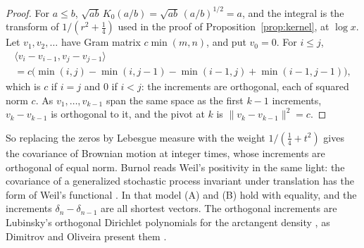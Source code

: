 \documentclass[11pt]{article}
\theoremstyle{definition}
\newcommand{\KH}{K}
\begin{document}
\begin{proof}
For $a \le b$, $\sqrt{ab}\,\KH_0(a/b) = \sqrt{ab}\,(a/b)^{1/2} = a$, and the integral is the transform of $1/(r^2 +
\frac14)$ used in the proof of Proposition~\ref{prop:kernel}, at $\log x$. Let $v_1, v_2, \dots$ have Gram matrix $c
\min(m, n)$, and put $v_0 = 0$. For $i \le j$,
\begin{multline*}
\langle v_i - v_{i - 1}, v_j - v_{j - 1}\rangle \\
= c\big(\min(i, j) - \min(i, j - 1) - \min(i - 1, j) + \min(i - 1, j - 1)\big),
\end{multline*}
which is $c$ if $i = j$ and $0$ if $i < j$: the increments are orthogonal, each of squared norm $c$. As $v_1, \dots,
v_{k - 1}$ span the same space as the first $k - 1$ increments, $v_k - v_{k - 1}$ is orthogonal to it, and the pivot
at $k$ is $\|v_k - v_{k - 1}\|^2 = c$.
\end{proof}

So replacing the zeros by Lebesgue measure with the weight $1/(\frac14 + t^2)$ gives the covariance of Brownian motion
at integer times, whose increments are orthogonal of equal norm. Burnol reads Weil's positivity in the same light: the
covariance of a generalized stochastic process invariant under translation has the form of Weil's functional
\cite{burnol98}. In that model (A) and (B) hold with equality, and the
increments $\delta_n - \delta_{n - 1}$ are all shortest vectors. The orthogonal increments are Lubinsky's orthogonal
Dirichlet polynomials for the arctangent density \cite{lubinsky14}, as Dimitrov and Oliveira present them
\cite[\S2.3]{dimitrov-oliveira}.
\end{document}
